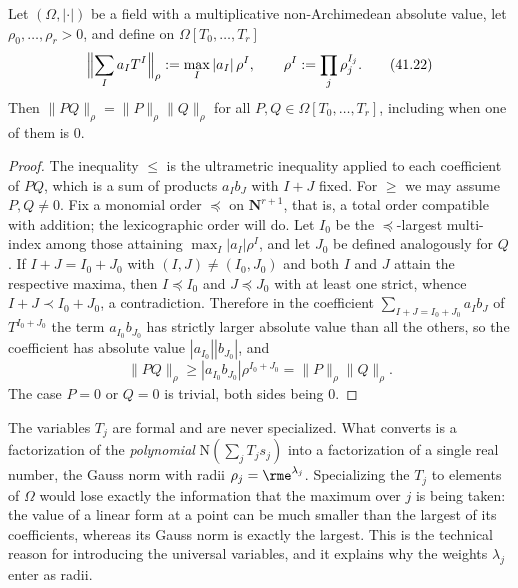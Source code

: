 \begin{lemma}
\label{lem:ch41-gauss-multiplicative}
Let $(\Omega,|\cdot|)$ be a field with a multiplicative non-Archimedean
absolute value, let $\rho_0,\dots,\rho_r>0$, and define on
$\Omega[T_0,\dots,T_r]$
\[
 \Bigl\|\sum_Ia_IT^I\Bigr\|_\rho:=\max_I|a_I|\,\rho^I,
 \qquad
 \rho^I:=\prod_j\rho_j^{I_j}.
\tag{41.22}\label{eq:ch41-gauss-norm}
\]
Then $\|PQ\|_\rho=\|P\|_\rho\|Q\|_\rho$ for all
$P,Q\in\Omega[T_0,\dots,T_r]$, including when one of them is $0$.
\end{lemma}

\begin{proof}
The inequality $\le$ is the ultrametric inequality applied to each
coefficient of $PQ$, which is a sum of products $a_Ib_J$ with
$I+J$ fixed.  For $\ge$ we may assume $P,Q\ne0$.  Fix a monomial order
$\preceq$ on $\mathbf N^{r+1}$, that is, a total order compatible with
addition; the lexicographic order will do.  Let $I_0$ be the
$\preceq$-largest multi-index among those attaining
$\max_I|a_I|\rho^I$, and let $J_0$ be defined analogously for $Q$.
If $I+J=I_0+J_0$ with $(I,J)\ne(I_0,J_0)$ and both $I$ and $J$
attain the respective maxima, then $I\preceq I_0$ and $J\preceq J_0$
with at least one strict, whence $I+J\prec I_0+J_0$, a contradiction.
Therefore in the coefficient
$\sum_{I+J=I_0+J_0}a_Ib_J$ of $T^{I_0+J_0}$ the term
$a_{I_0}b_{J_0}$ has strictly larger absolute value than all the others,
so the coefficient has absolute value $|a_{I_0}||b_{J_0}|$, and
\[
 \|PQ\|_\rho\ge|a_{I_0}b_{J_0}|\rho^{I_0+J_0}
 =\|P\|_\rho\|Q\|_\rho .
\]
The case $P=0$ or $Q=0$ is trivial, both sides being $0$.
\end{proof}

\begin{remark}
\label{rem:ch41-why-gauss}
The variables $T_j$ are formal and are never specialized.  What
 converts is a factorization of the
\emph{polynomial} $\mathrm N(\sum_jT_js_j)$ into a factorization of a
single real number, the Gauss norm with radii
$\rho_j=\rme^{\lambda_j}$.  Specializing the $T_j$ to elements of
$\Omega$ would lose exactly the information that the maximum over $j$ is
being taken: the value of a linear form at a point can be much smaller than
the largest of its coefficients, whereas its Gauss norm is exactly the
largest.  This is the technical reason for introducing the universal
variables, and it explains why the weights $\lambda_j$ enter as radii.
\end{remark}

